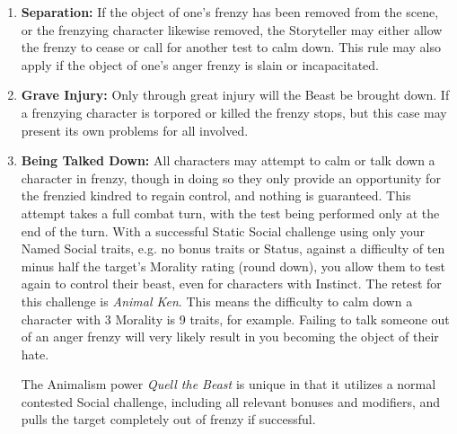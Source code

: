 \begin{enumerate}
	\item \textbf{Separation:}  If the object of one's frenzy has been removed from the scene, or the 
	frenzying character likewise removed, the Storyteller may either allow the frenzy to cease or 
	call for another test to calm down.  This rule may also apply if the object of one's anger frenzy 
	is slain or incapacitated.
	\item \textbf{Grave Injury:}  Only through great injury will the Beast be brought down.  If a 
	frenzying character is torpored or killed the frenzy stops, but this case may present its own 
	problems for all involved.
	\item \textbf{Being Talked Down:} All characters may attempt to calm or talk down a character in frenzy, 
	though in doing so they only provide an opportunity for the frenzied kindred to regain control, and 
	nothing is guaranteed.  This attempt takes a full combat turn, with the test being performed only at the end 
	of the turn.  With a successful Static Social challenge using only your Named Social traits, 
	e.g. no bonus traits or Status, against a difficulty of ten minus half the target's Morality rating 
	(round down), you allow them to test again to control their beast, even for characters with Instinct.  
	The retest for this challenge is \emph{Animal Ken}.  This means the difficulty to calm down a character 
	with 3 Morality is 9 traits, for example.  Failing to talk someone out of an anger frenzy will very likely 
	result in you becoming the object of their hate.
	
	The Animalism power \emph{Quell the Beast} is unique in that it utilizes a normal contested Social 
	challenge, including all relevant bonuses and modifiers, and pulls the target completely out of frenzy 
	if successful.
\end{enumerate}